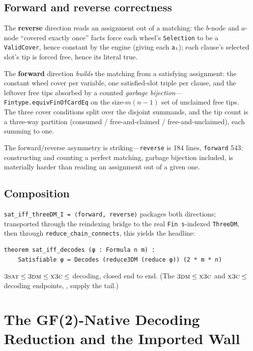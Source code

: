 \documentclass[a4paper,UKenglish,cleveref,autoref]{lipics-v2021}
\begin{document}
\subsection{Forward and reverse correctness}\label{sec:fwdrev}

The \textbf{reverse} direction reads an assignment out of a matching: the $b$-node and $a$-node ``covered
exactly once'' facts force each wheel's \lstinline{Selection} to be a \lstinline{ValidCover}, hence constant by
the engine (giving each \lstinline{aᵢ}); each clause's selected slot's tip is forced free, hence its literal
true.

The \textbf{forward} direction \emph{builds} the matching from a satisfying assignment: the constant wheel cover
per variable, one satisfied-slot triple per clause, and the leftover free tips absorbed by a counted
\emph{garbage bijection}---\lstinline{Fintype.equivFinOfCardEq} on the size-$m(n{-}1)$ set of unclaimed free
tips. The three cover conditions split over the disjoint summands, and the tip count is a three-way partition
(consumed / free-and-claimed / free-and-unclaimed), each summing to one.

The forward/reverse asymmetry is striking---\lstinline{reverse} is 184 lines, \lstinline{forward} 543:
constructing and counting a perfect matching, garbage bijection included, is materially harder than reading an
assignment out of a given one.

\subsection{Composition}\label{sec:compose}

\lstinline{sat_iff_threeDM_I = ⟨forward, reverse⟩} packages both directions; transported through the reindexing
bridge to the real \lstinline{Fin s}-indexed \lstinline{ThreeDM}, then through \lstinline{reduce_chain_connects},
this yields the headline:
\begin{lstlisting}
theorem sat_iff_decodes (φ : Formula n m) :
    Satisfiable φ ↔ Decodes (reduce3DM (reduce φ)) (2 * m * n)
\end{lstlisting}
$\textsc{3sat} \le \textsc{3dm} \le \textsc{x3c} \le$ decoding, closed end to end. (The
$\textsc{3dm} \le \textsc{x3c}$ and $\textsc{x3c} \le$ decoding endpoints, , supply the tail.)

\section{The GF(2)-Native Decoding Reduction and the Imported Wall}\label{sec:gf2}
\end{document}
